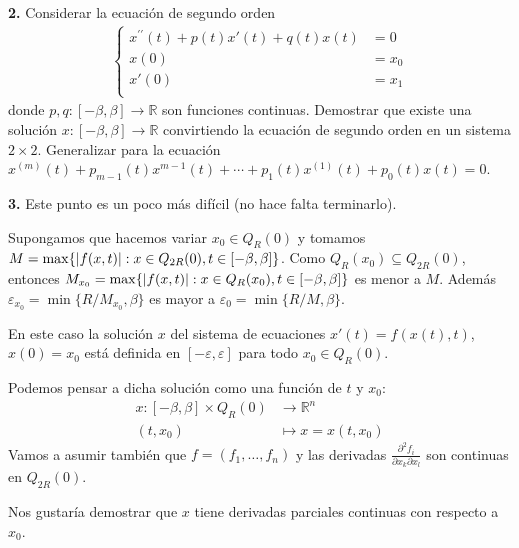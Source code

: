 \documentclass{article}
\newcommand{\realnum}{\mathbb{R}}
\begin{document}
\textbf{2.}
Considerar la ecuación de segundo orden
\begin{align}
    \left\{\begin{aligned}
    x^{\prime \prime} (t) + p(t) x'(t) + q(t) x(t) &= 0 \\
    x(0) &= x_0 \\
    x'(0)   &= x_1  \\
    \end{aligned}\right.
\end{align}
donde $p, q : [- \beta, \beta] \rightarrow \realnum$ son funciones continuas.
Demostrar que existe una solución $x : [- \beta, \beta] \rightarrow \realnum$ convirtiendo la ecuación de segundo orden en un sistema $2 \times 2$.
Generalizar para la ecuación $x^{(m)}(t) + p_{m - 1}(t) x^{m - 1}(t) + \cdots + p_1(t) x^{(1)}(t) + p_0(t) x(t) = 0$.

\textbf{3.}
Este punto es un poco más difícil (no hace falta terminarlo).

Supongamos que hacemos variar $x_0 \in Q_R(0)$ y tomamos $M = \max\{\abs{f(x, t)} : x \in Q_{2 R}(0), t \in [- \beta, \beta]\}$.
Como $Q_R(x_0) \subseteq Q_{2 R}(0)$, entonces $M_{x_0} = \max\{\abs{f(x, t)} : x\in Q_R(x_0), t \in [- \beta, \beta]\}$ es menor a $M$.
Además $\varepsilon_{x_0} = \min\{R / M_{x_0}, \beta\}$ es mayor a $\varepsilon_0 = \min\{R / M, \beta\}$.

En este caso la solución $x$ del sistema de ecuaciones $x'(t) = f(x(t), t)$, $x(0) = x_0$ está definida en $[- \varepsilon, \varepsilon]$ para todo $x_0 \in Q_R(0)$.

Podemos pensar a dicha solución como una función de $t$ y $x_0$:
\begin{align}
    x : [- \beta, \beta] \times Q_R(0) &\longrightarrow \realnum^n \\
    (t, x_0) &\longmapsto x = x(t, x_0)
\end{align}
Vamos a asumir también que $f = (f_1, \dots, f_n)$ y las derivadas $\frac{\partial^2 f_i}{\partial x_k \partial x_l}$ son continuas en $Q_{2 R}(0)$.

Nos gustaría demostrar que $x$ tiene derivadas parciales continuas con respecto a $x_0$.
\end{document}
